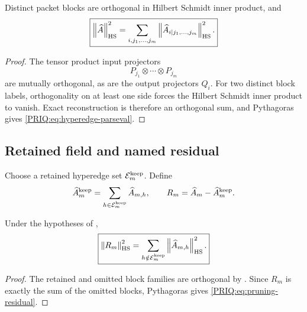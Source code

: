 \begin{PRIQtheorem}\label{PRIQ:thm:hyperedge-parseval}
Distinct packet blocks are orthogonal in Hilbert Schmidt inner product, and
\begin{equation}\label{PRIQ:eq:hyperedge-parseval}
  \boxed{
  \left\lVert \widehat A\right\rVert_{\mathrm{HS}}^2
  =
  \sum_{i,j_1,\ldots,j_m}
  \left\lVert \widehat A_{i\mid j_1,\ldots,j_m}\right\rVert_{\mathrm{HS}}^2.}
\end{equation}
\end{PRIQtheorem}

\begin{proof}
The tensor product input projectors
\[
  P_{j_1}\otimes\cdots\otimes P_{j_m}
\]
are mutually orthogonal, as are the output projectors $Q_i$.  For two distinct block labels, orthogonality on at least one side forces the Hilbert Schmidt inner product to vanish.  Exact reconstruction is therefore an orthogonal sum, and Pythagoras gives \eqref{PRIQ:eq:hyperedge-parseval}.
\end{proof}

\subsection{Retained field and named residual}
Choose a retained hyperedge set $\mathcal E_m^{\mathrm{keep}}$.  Define
\begin{equation}\label{PRIQ:eq:pruned-tensor}
  \widehat A_m^{\mathrm{keep}}
  =
  \sum_{h\in\mathcal E_m^{\mathrm{keep}}}
  \widehat A_{m,h},
  \qquad
  R_m
  =
  \widehat A_m-\widehat A_m^{\mathrm{keep}}.
\end{equation}

\begin{PRIQcorollary}\label{PRIQ:cor:pruning-residual}
Under the hypotheses of ,
\begin{equation}\label{PRIQ:eq:pruning-residual}
  \boxed{
  \left\lVert R_m\right\rVert_{\mathrm{HS}}^2
  =
  \sum_{h\notin\mathcal E_m^{\mathrm{keep}}}
  \left\lVert \widehat A_{m,h}\right\rVert_{\mathrm{HS}}^2.}
\end{equation}
\end{PRIQcorollary}

\begin{proof}
The retained and omitted block families are orthogonal by .  Since $R_m$ is exactly the sum of the omitted blocks, Pythagoras gives \eqref{PRIQ:eq:pruning-residual}.
\end{proof}

